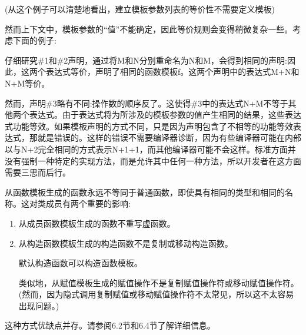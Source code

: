 (从这个例子可以清楚地看出，建立模板参数列表的等价性不需要定义模板)

然而上下文中，模板参数的“值”不能确定，因此等价规则会变得稍微复杂一些。考虑下面的例子:


仔细研究\#1和\#2声明，通过将M和N分别重命名为N和M，会得到相同的声明:因此，这两个表达式等价，声明了相同的函数模板f。这两个声明中的表达式M+N和N+M等价。

然而，声明\#3略有不同:操作数的顺序反了。这使得\#3中的表达式N+M不等于其他两个表达式。由于表达式将为所涉及的模板参数的值产生相同的结果，这些表达式功能等效。如果模板声明的方式不同，只是因为声明包含了不相等的功能等效表达式，那就是错误的。这样的错误不需要编译器诊断，因为有些编译器可能在内部以与N+2完全相同的方式表示N+1+1，而其他编译器可能不会这样。标准方面并没有强制一种特定的实现方法，而是允许其中任何一种方法，所以开发者在这方面需要三思而后行。

从函数模板生成的函数永远不等同于普通函数，即使具有相同的类型和相同的名称。这对类成员有两个重要的影响:

\begin{enumerate}
\item
从成员函数模板生成的函数不重写虚函数。

\item
从构造函数模板生成的构造函数不是复制或移动构造函数。

\begin{notice}默认构造函数可以构造函数模板。
\end{notice}

类似地，从赋值模板生成的赋值操作不是复制赋值操作符或移动赋值操作符。(然而，因为隐式调用复制赋值或移动赋值操作符不太常见，所以这不太容易出现问题。)
\end{enumerate}

这种方式优缺点并存。请参阅6.2节和6.4节了解详细信息。











